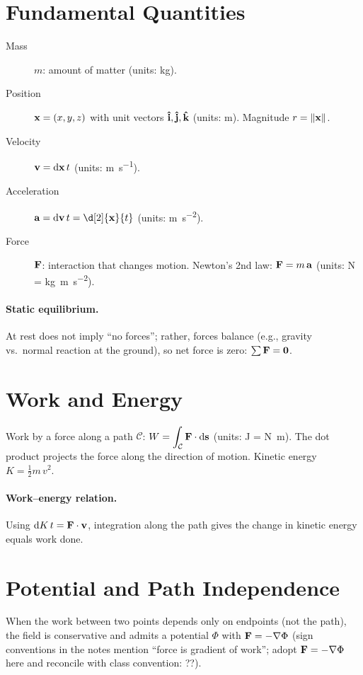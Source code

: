 \documentclass[11pt,a4paper]{article}
\begin{document}
\section{Fundamental Quantities}
\begin{description}
  \item [Mass] $m$: amount of matter (units: kg).
  \item [Position] $\vb{x}=(x,y,z)$ with unit vectors $\vu{i},\vu{j},\vu{k}$ (units: \si{m}). Magnitude $r=\norm{\vb{x}}$.
  \item [Velocity] $\vb{v}=\dd{\vb{x}}{t}$ (units: \si{m.s^{-1}}).
  \item [Acceleration] $\vb{a}=\dd{\vb{v}}{t}=\d[2]{\vb{x}}{t}$ (units: \si{m.s^{-2}}).
  \item [Force] $\vb{F}$: interaction that changes motion. Newton's 2nd law: $\vb{F}=m\,\vb{a}$ (units: \si{N} = \si{kg.m.s^{-2}}).
\end{description}

\paragraph{Static equilibrium.} At rest does not imply ``no forces''; rather, forces balance (e.g., gravity vs.~normal reaction at the ground), so net force is zero: $\sum\vb{F}=\vb{0}$.

\section{Work and Energy}
Work by a force along a path $\mathcal{C}$: \; $W=\displaystyle\int_{\mathcal{C}} \vb{F}\cdot\dd{\vb{s}}$ (units: J = \si{N.m}). The dot product projects the force along the direction of motion. Kinetic energy $K=\tfrac12 m\,v^2$.

\paragraph{Work--energy relation.} Using $\dd{K}{t}=\vb{F}\cdot\vb{v}$, integration along the path gives the change in kinetic energy equals work done.

\section{Potential and Path Independence}
When the work between two points depends only on endpoints (not the path), the field is conservative and admits a potential $\Phi$ with $\vb{F} = -\nabla\Phi$ (sign conventions in the notes mention ``force is gradient of work''; adopt $\vb{F} = -\nabla\Phi$ here and reconcile with class convention: ??).
\end{document}
